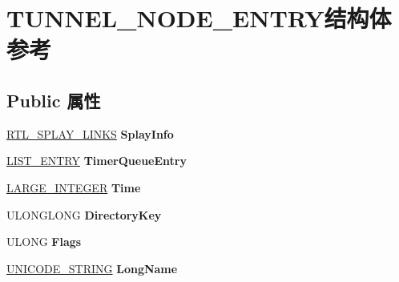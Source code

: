 \hypertarget{struct_t_u_n_n_e_l___n_o_d_e___e_n_t_r_y}{}\section{T\+U\+N\+N\+E\+L\+\_\+\+N\+O\+D\+E\+\_\+\+E\+N\+T\+R\+Y结构体 参考}
\label{struct_t_u_n_n_e_l___n_o_d_e___e_n_t_r_y}
\subsection*{Public 属性}
\begin{DoxyCompactItemize}
\item 
\mbox{\label{struct_t_u_n_n_e_l___n_o_d_e___e_n_t_r_y_a5590d10ab704c4a2711b82bd2d8ea404}} 
\hyperlink{struct___r_t_l___s_p_l_a_y___l_i_n_k_s}{R\+T\+L\+\_\+\+S\+P\+L\+A\+Y\+\_\+\+L\+I\+N\+KS} {\bfseries Splay\+Info}
\item 
\mbox{\label{struct_t_u_n_n_e_l___n_o_d_e___e_n_t_r_y_aba3ff9a5cfe44a621f929208d76a36cd}} 
\hyperlink{struct___l_i_s_t___e_n_t_r_y}{L\+I\+S\+T\+\_\+\+E\+N\+T\+RY} {\bfseries Timer\+Queue\+Entry}
\item 
\mbox{\label{struct_t_u_n_n_e_l___n_o_d_e___e_n_t_r_y_a26bc08e8ae4729676088767c21aa71cd}} 
\hyperlink{union___l_a_r_g_e___i_n_t_e_g_e_r}{L\+A\+R\+G\+E\+\_\+\+I\+N\+T\+E\+G\+ER} {\bfseries Time}
\item 
\mbox{\label{struct_t_u_n_n_e_l___n_o_d_e___e_n_t_r_y_ac8f5db65003622c9ef51abfb18885d64}} 
U\+L\+O\+N\+G\+L\+O\+NG {\bfseries Directory\+Key}
\item 
\mbox{\label{struct_t_u_n_n_e_l___n_o_d_e___e_n_t_r_y_ad8ec9674fce7adfd95e6edefd252043d}} 
U\+L\+O\+NG {\bfseries Flags}
\item 
\mbox{\label{struct_t_u_n_n_e_l___n_o_d_e___e_n_t_r_y_ae37775706c0b8fba118bab90da21ef88}} 
\hyperlink{struct___u_n_i_c_o_d_e___s_t_r_i_n_g}{U\+N\+I\+C\+O\+D\+E\+\_\+\+S\+T\+R\+I\+NG} {\bfseries Long\+Name}
\item 

\end{DoxyCompactItemize}
